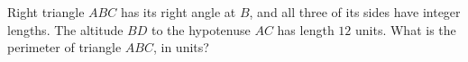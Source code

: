 Right triangle $ABC$ has its right angle at $B$, and all three of its sides have integer lengths. The altitude $BD$ to the hypotenuse $AC$ has length $12$ units. What is the perimeter of triangle $ABC$, in units?
